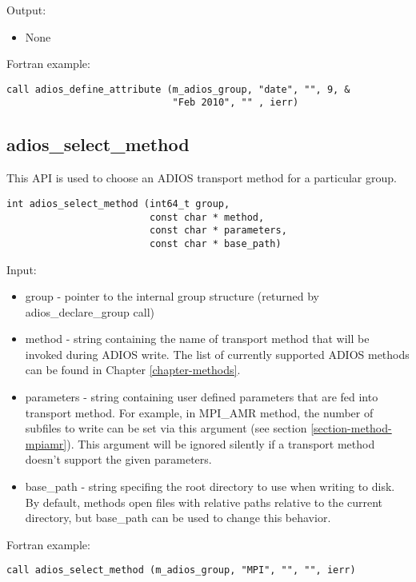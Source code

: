 Output:
\begin{itemize}
\item None
\end{itemize}

Fortran example: 
\begin{lstlisting}[alsolanguage=Fortran,caption={},label={}]
call adios_define_attribute (m_adios_group, "date", "", 9, &
                             "Feb 2010", "" , ierr)
\end{lstlisting}


\subsection{adios\_select\_method}
This API is used to choose an ADIOS transport method for a particular group. 

\begin{lstlisting}[alsolanguage=C,caption={},label={}]
int adios_select_method (int64_t group, 
                         const char * method,
                         const char * parameters,
                         const char * base_path)
\end{lstlisting}

Input:
\begin{itemize}
\item group - pointer to the internal group structure (returned by adios\_declare\_group 
call)

\item method - string containing the name of transport method that will be invoked during 
ADIOS write. The list of currently supported ADIOS methods can be found in Chapter 
\ref{chapter-methods}.

\item parameters - string containing user defined parameters that are fed into transport 
method.  For example, in MPI\_AMR method, the number of subfiles to write can be 
set via this argument (see section \ref{section-method-mpiamr}).
This argument will be ignored silently if a transport method doesn't support 
the given parameters.

\item base\_path -  string specifing the root directory to use when writing to disk. 
By default, methods open files with relative paths relative to the current directory, 
but base\_path can be used to change this behavior.
\end{itemize}

Fortran example: 
\begin{lstlisting}[alsolanguage=Fortran,caption={},label={}]
call adios_select_method (m_adios_group, "MPI", "", "", ierr)
\end{lstlisting}

